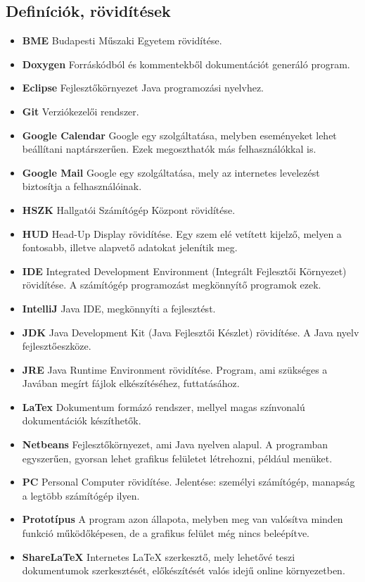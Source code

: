 \subsection{Definíciók, rövidítések}
\begin{itemize}
\item \textbf{BME}	Budapesti Műszaki Egyetem rövidítése.
\item \textbf{Doxygen}	Forráskódból és kommentekből dokumentációt generáló program.
\item \textbf{Eclipse}	Fejlesztőkörnyezet Java programozási nyelvhez.
\item \textbf{Git}	Verziókezelői rendszer.
\item \textbf{Google Calendar}	Google egy szolgáltatása, melyben eseményeket lehet beállítani naptárszerűen. Ezek megoszthatók más felhasználókkal is.
\item \textbf{Google Mail}	Google egy szolgáltatása, mely az internetes levelezést biztosítja a felhasználóinak.
\item \textbf{HSZK}		Hallgatói Számítógép Központ rövidítése.
\item \textbf{HUD}	Head-Up Display rövidítése. Egy szem elé vetített kijelző, melyen a fontosabb, illetve alapvető adatokat jelenítik meg.
\item \textbf{IDE}	Integrated Development Environment (Integrált Fejlesztői Környezet) rövidítése. A számítógép programozást megkönnyítő programok ezek.
\item \textbf{IntelliJ}	Java IDE, megkönnyíti a fejlesztést.
\item \textbf{JDK}	Java Development Kit (Java Fejlesztői Készlet) rövidítése. A Java nyelv fejlesztőeszköze.
\item \textbf{JRE}	Java Runtime Environment rövidítése. Program, ami szükséges a Javában megírt fájlok elkészítéséhez, futtatásához.
\item \textbf{LaTex}		Dokumentum formázó rendszer, mellyel magas színvonalú dokumentációk készíthetők.
\item \textbf{Netbeans}	Fejlesztőkörnyezet, ami Java nyelven alapul. A programban egyszerűen, gyorsan lehet grafikus felületet létrehozni, például menüket.
\item \textbf{PC}	Personal Computer rövidítése. Jelentése: személyi számítógép, manapság a legtöbb számítógép ilyen.
\item \textbf{Prototípus}	A program azon állapota, melyben meg van valósítva minden funkció működőképesen, de a grafikus felület még nincs beleépítve.
\item \textbf{ShareLaTeX}	Internetes LaTeX szerkesztő, mely lehetővé teszi dokumentumok szerkesztését, előkészítését valós idejű online környezetben.

\end{itemize}
